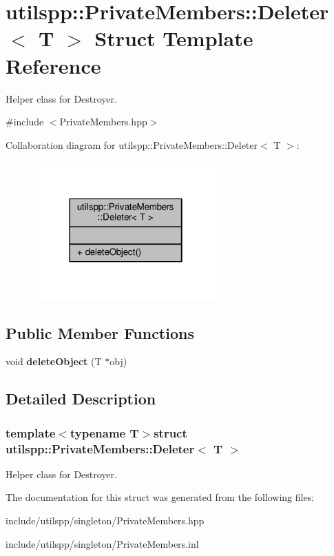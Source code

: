 \hypertarget{structutilspp_1_1PrivateMembers_1_1Deleter}{\section{utilspp\-:\-:Private\-Members\-:\-:Deleter$<$ T $>$ Struct Template Reference}
\label{structutilspp_1_1PrivateMembers_1_1Deleter}
}


Helper class for Destroyer.  




{\ttfamily \#include $<$Private\-Members.\-hpp$>$}



Collaboration diagram for utilspp\-:\-:Private\-Members\-:\-:Deleter$<$ T $>$\-:
\nopagebreak
\begin{figure}[H]
\begin{center}
\leavevmode
\includegraphics[width=202pt]{structutilspp_1_1PrivateMembers_1_1Deleter__coll__graph}
\end{center}
\end{figure}
\subsection*{Public Member Functions}
\begin{DoxyCompactItemize}
\item 
\hypertarget{structutilspp_1_1PrivateMembers_1_1Deleter_ac1733f7f90b94aaba61df48476bfba4a}{void {\bfseries delete\-Object} (T $\ast$obj)}\label{structutilspp_1_1PrivateMembers_1_1Deleter_ac1733f7f90b94aaba61df48476bfba4a}

\end{DoxyCompactItemize}


\subsection{Detailed Description}
\subsubsection*{template$<$typename T$>$struct utilspp\-::\-Private\-Members\-::\-Deleter$<$ T $>$}

Helper class for Destroyer. 

The documentation for this struct was generated from the following files\-:\begin{DoxyCompactItemize}
\item 
include/utilspp/singleton/Private\-Members.\-hpp\item 
include/utilspp/singleton/Private\-Members.\-inl\end{DoxyCompactItemize}

